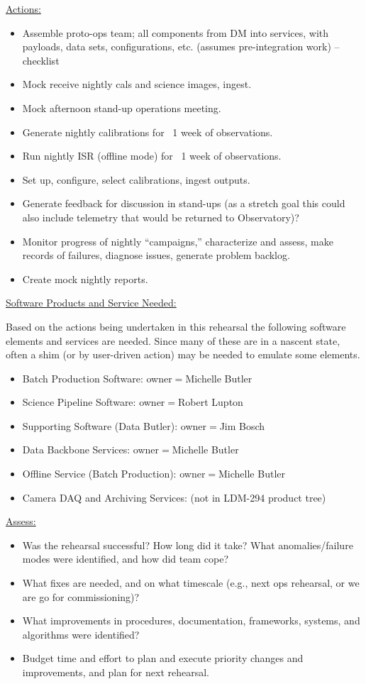 \underline{Actions:}

\begin{itemize}
\item Assemble proto-ops team; all components from DM into services, with payloads, data sets, configurations, etc. (assumes pre-integration work) -- checklist
\item Mock receive nightly cals and science images, ingest.
\item Mock afternoon stand-up operations meeting.
\item Generate nightly calibrations for ~1 week of observations.
\item Run nightly ISR (offline mode) for ~1 week of observations.
\item Set up, configure, select calibrations, ingest outputs.
\item Generate feedback for discussion in stand-ups (as a stretch goal this could also include telemetry that would be returned to Observatory)?
\item Monitor progress of nightly “campaigns,” characterize and assess, make records of failures, diagnose issues, generate problem backlog.
\item Create mock nightly reports.
\end{itemize}

\clearpage

\underline{Software Products and Service Needed:}

Based on the actions being undertaken in this rehearsal the following software elements and services are needed.  Since many of these are in a nascent state, often a shim (or by user-driven action) may be needed to emulate some elements.

\begin{itemize}
\item Batch Production Software: owner$=$Michelle Butler
\item Science Pipeline Software: owner$=$Robert Lupton
\item Supporting Software (Data Butler): owner$=$Jim Bosch
\item Data Backbone Services: owner$=$Michelle Butler
\item Offline Service (Batch Production): owner$=$Michelle Butler
\item Camera DAQ and Archiving Services: (not in LDM-294 product tree)
\end{itemize}

\underline{Assess:}

\begin{itemize}
\item Was the rehearsal successful? How long did it take? What anomalies/failure modes were identified, and how did team cope? 
\item What fixes are needed, and on what timescale (e.g., next ops rehearsal, or we are go for commissioning)? 
\item What improvements in procedures, documentation, frameworks, systems, and algorithms were identified?
\item Budget time and effort to plan and execute priority changes and improvements, and plan for next rehearsal.
\end{itemize}



